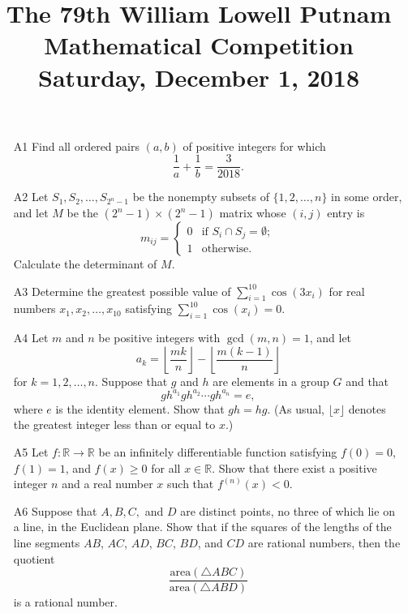 \documentclass[amssymb,twocolumn,pra,10pt,aps]{revtex4-1}
\begin{document}
\title{The 79th William Lowell Putnam Mathematical Competition \\
    Saturday, December 1, 2018}
\maketitle

\begin{itemize}

\item[A1]
Find all ordered pairs $(a,b)$ of positive integers for which
\[
\frac{1}{a} + \frac{1}{b} = \frac{3}{2018}.
\]

\item[A2]
Let $S_1, S_2, \dots, S_{2^n-1}$ be the nonempty subsets of $\{1,2,\dots,n\}$ in some order, and let
$M$ be the $(2^n-1) \times (2^n-1)$ matrix whose $(i,j)$ entry is
\[
m_{ij} = \begin{cases} 0 & \mbox{if }S_i \cap S_j = \emptyset; \\
1 & \mbox{otherwise.}
\end{cases}
\]
Calculate the determinant of $M$.

\item[A3]
Determine the greatest possible value of $\sum_{i=1}^{10} \cos(3x_i)$ for real numbers $x_1,x_2,\dots,x_{10}$
satisfying $\sum_{i=1}^{10} \cos(x_i) = 0$.
 
\item[A4]
Let $m$ and $n$ be positive integers with $\gcd(m,n) = 1$, and let
\[
a_k = \left\lfloor \frac{mk}{n} \right\rfloor - \left\lfloor \frac{m(k-1)}{n} \right\rfloor
\]
for $k=1,2,\dots,n$.
Suppose that $g$ and $h$ are elements in a group $G$ and that 
\[
gh^{a_1} gh^{a_2} \cdots gh^{a_n} = e,
\]
where $e$ is the identity element. Show that $gh= hg$. (As usual, $\lfloor x \rfloor$ denotes the greatest integer
less than or equal to $x$.)
 
\item[A5]
Let $f: \mathbb{R} \to \mathbb{R}$ be an infinitely differentiable function satisfying $f(0) = 0$, $f(1)= 1$,
and $f(x) \geq 0$ for all $x \in \mathbb{R}$. Show that there exist a positive integer $n$ and a real number $x$
such that $f^{(n)}(x) < 0$.

\item[A6] 
Suppose that $A,B,C,$ and $D$ are distinct points, no three of which lie on a line,
in the Euclidean plane. Show
that if the squares of the lengths of the line segments $AB$, $AC$, $AD$, $BC$, $BD$, and $CD$
are rational numbers, then
the quotient
\[
\frac{\mathrm{area}(\triangle ABC)}{\mathrm{area}(\triangle ABD)}
\]
is a rational number.


\end{itemize}
\end{document}
